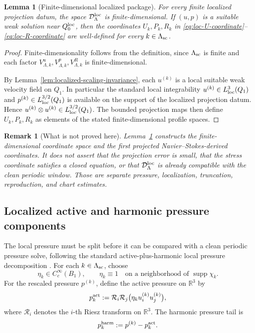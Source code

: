 \documentclass[11pt]{article}
\numberwithin{equation}{section}
\newtheorem{lemma}[theorem]{Lemma}
\newtheorem{remark}[theorem]{Remark}
\newcommand{\R}{\mathbb R}
\begin{document}
\begin{lemma}[Finite-dimensional localized package]\label{lem:localized-package-well-defined}
For every finite localized projection datum, the space
\(\mathcal D_\Lambda^{\rm loc}\) is finite-dimensional.  If \((u,p)\) is
a suitable weak solution near \(Q_0^{\rm loc}\), then the coordinates
\(U_k,P_k,R_k\) in
\eqref{eq:loc-U-coordinate}--\eqref{eq:loc-R-coordinate} are well-defined
for every \(k\in\Lambda_{\rm sc}\).
\end{lemma}

\begin{proof}
Finite-dimensionality follows from the definition, since
\(\Lambda_{\rm sc}\) is finite and each factor
\(V_{\Lambda,k}^u,V_{\Lambda,k}^p,V_{\Lambda,k}^R\) is finite-dimensional.

By Lemma~\ref{lem:localized-scaling-invariance}, each \(u^{(k)}\) is a
local suitable weak velocity field on \(Q_1\).  In particular the standard
local integrability \(u^{(k)}\in L^3_{\rm loc}(Q_1)\) and
\(p^{(k)}\in L^{3/2}_{\rm loc}(Q_1)\) is available on the support of the
localized projection datum.  Hence \(u^{(k)}\otimes u^{(k)}\in
L^{3/2}_{\rm loc}(Q_1)\).  The bounded projection maps then define
\(U_k,P_k,R_k\) as elements of the stated finite-dimensional profile
spaces.
\end{proof}

\begin{remark}[What is not proved here]
Lemma~\ref{lem:localized-package-well-defined} constructs the
finite-dimensional coordinate space and the first projected
Navier--Stokes-derived coordinates.  It does not assert that the projection
error is small, that the stress coordinate satisfies a closed equation, or
that \(\mathcal D_\Lambda^{\rm loc}\) is already compatible with the clean
periodic window.  Those are separate pressure, localization, truncation,
reproduction, and chart estimates.
\end{remark}

\subsection{Localized active and harmonic pressure components}\label{subsec:localized-pressure-splitting}

The local pressure must be split before it can be compared with a clean
periodic pressure solve, following the standard active-plus-harmonic local pressure decomposition \cite{SohrWahl1986,Wolf2017,SereginLectureNotes}.  For each \(k\in\Lambda_{\rm sc}\), choose
\[
        \eta_k\in C_c^\infty(B_1),
        \qquad
        \eta_k\equiv1
        \quad\text{on a neighborhood of }\operatorname{supp}\chi_k .
\]
For the rescaled pressure \(p^{(k)}\), define the active pressure on
\(\R^3\) by
\begin{equation}\label{eq:localized-active-pressure}
        p_k^{\rm act}
        :=
        \mathcal R_i\mathcal R_j
        \bigl(\eta_k u_i^{(k)}u_j^{(k)}\bigr),
\end{equation}
where \(\mathcal R_i\) denotes the \(i\)-th Riesz transform on
\(\R^3\).  The harmonic pressure tail is
\[
        p_k^{\rm harm}:=p^{(k)}-p_k^{\rm act}.
\]
\end{document}

